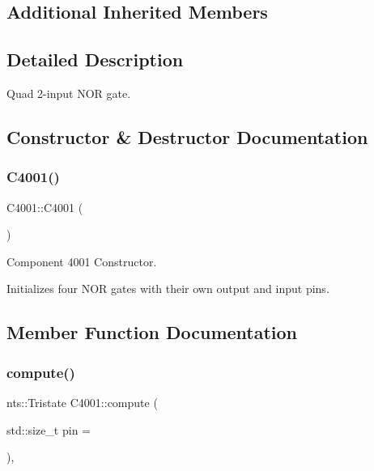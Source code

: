 \subsection*{Additional Inherited Members}


\subsection{Detailed Description}
Quad 2-\/input N\+OR gate. 

\subsection{Constructor \& Destructor Documentation}
\mbox{\label{classC4001_a3d1e79c23128b34f32bd941682ea2e66}} 
\subsubsection{\texorpdfstring{C4001()}{C4001()}}
{\footnotesize\ttfamily C4001\+::\+C4001 (\begin{DoxyParamCaption}{ }\end{DoxyParamCaption})}



Component 4001 Constructor. 

Initializes four N\+OR gates with their own output and input pins. 

\subsection{Member Function Documentation}
\mbox{\label{classC4001_a2f3b7d19b418d8fbcfe08ed94b6a3e3a}} 
\subsubsection{\texorpdfstring{compute()}{compute()}}
{\footnotesize\ttfamily nts\+::\+Tristate C4001\+::compute (\begin{DoxyParamCaption}\item[{std\+::size\+\_\+t}]{pin = {} }\end{DoxyParamCaption})\hspace{0.3cm}{\ttfamily [override]}, {\ttfamily [virtual]}}



